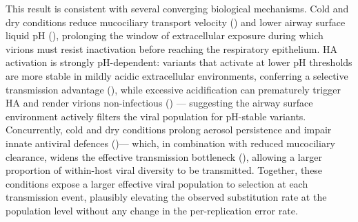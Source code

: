\documentclass{pnas-new}
\begin{document}
This result is consistent with several converging biological mechanisms. Cold and dry conditions reduce mucociliary transport velocity (\cite{kelly_rapid_2021, kilgour_mucociliary_2004}) and lower airway surface liquid pH (\cite{kudo_low_2019}), prolonging the window of extracellular exposure during which virions must resist inactivation before reaching the respiratory epithelium. HA activation is strongly pH-dependent: variants that activate at lower pH thresholds are more stable in mildly acidic extracellular environments, conferring a selective transmission advantage (\cite{russier_molecular_2016, singanayagam_influenza_2019}), while excessive acidification can prematurely trigger HA and render virions non-infectious (\cite{tosheva_hemagglutinin_2023}) — suggesting the airway surface environment actively filters the viral population for pH-stable variants. Concurrently, cold and dry conditions prolong aerosol persistence and impair innate antiviral defences (\cite{lowen_influenza_2007, kudo_low_2019})— which, in combination with reduced mucociliary clearance, widens the effective transmission bottleneck (\cite{sobel_leonard_transmission_2017}), allowing a larger proportion of within-host viral diversity to be transmitted. Together, these conditions expose a larger effective viral population to selection at each transmission event, plausibly elevating the observed substitution rate at the population level without any change in the per-replication error rate.
\end{document}
